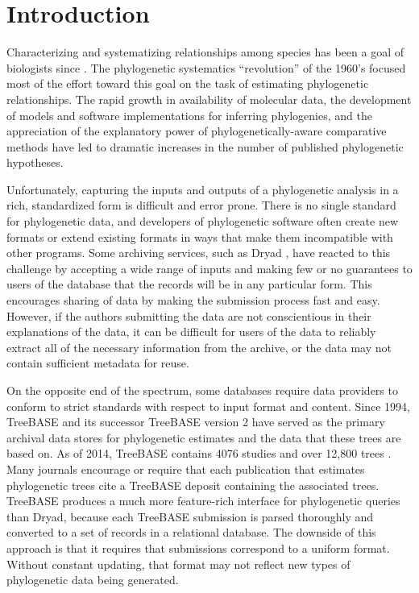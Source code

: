 \documentclass{bioinfo}
\begin{document}
\section{Introduction}

Characterizing and systematizing relationships among species has been a goal of biologists since \cite{Linne1758}.
The phylogenetic systematics ``revolution'' of the 1960's focused most of the effort toward this goal on the 
    task of estimating phylogenetic relationships.
The rapid growth in availability of molecular data, the development of models and software implementations for
    inferring phylogenies, and the appreciation of the explanatory power of phylogenetically-aware comparative methods
    \citep[e.g.][]{Felsenstein1985Comp} have led to dramatic increases
    in the number of published phylogenetic hypotheses.

Unfortunately, capturing the inputs and outputs of a phylogenetic analysis in a rich, standardized form is
 difficult and error prone. There is no single standard for phylogenetic data, and developers of phylogenetic software often create new formats or extend existing formats in ways that make them incompatible with other programs.
Some archiving services, such as Dryad \citep{Dryad}, have reacted to this challenge by accepting a 
    wide range of inputs and making few or no
    guarantees to users of the database that the records will be in any particular form.
This encourages sharing of data by making the submission process fast and easy. %
However, if the authors submitting the data are not conscientious in their explanations of the data, it can be difficult
    for users of the data to reliably extract all of the necessary information from the archive, or the data may not contain sufficient metadata for reuse.

On the opposite end of the spectrum, some databases require data providers to conform to strict
    standards with respect to input format and content.
Since 1994, TreeBASE \citep{SandersonDPE1994} and its successor TreeBASE version 2 \citep{TreeBase2} have served
    as the primary archival data stores for phylogenetic estimates and the data that these trees are based on.
As of 2014, TreeBASE contains 4076 studies and over 12,800 trees \citep{TreeBaseWebCite}.
Many journals encourage or require that each publication that estimates phylogenetic trees cite a TreeBASE
    deposit containing the associated trees.
TreeBASE produces a much more feature-rich interface for phylogenetic queries than Dryad, because each 
    TreeBASE submission is parsed thoroughly and converted to a set of records in a relational database.
The downside of this approach is that it requires that submissions correspond to a uniform format.
Without constant updating,
    that format may not reflect new types of phylogenetic data being generated.
\end{document}
